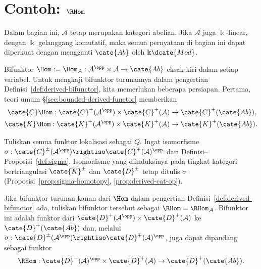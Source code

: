 
\section{Contoh: \texorpdfstring{$\RHom$}{RHom}}\label{sec:RHom}
\hypertarget{o014.aljabr2.chapter4.rhom}{ }

Dalam bagian ini, $\mathcal{A}$ tetap merupakan kategori abelian. Jika
$\mathcal{A}$ juga $\Bbbk$-linear, dengan $\Bbbk$ gelanggang komutatif, maka
semua pernyataan di bagian ini dapat diperkuat dengan mengganti $\cate{Ab}$
oleh $\Bbbk\dcate{Mod}$.

Bifunktor
$\Hom:=\Hom_{\mathcal{A}}:\mathcal{A}^{\opp}\times\mathcal{A}\to\cate{Ab}$
eksak kiri dalam setiap variabel. Untuk mengkaji bifunktor turunannya dalam
pengertian Definisi~\ref{def:derived-bifunctor}, kita memerlukan beberapa
persiapan. Pertama, teori umum \S\ref{sec:bounded-derived-functor} memberikan
\begin{align*}
	\cate{C}\Hom: \cate{C}^+(\mathcal{A}^{\opp}) \times \cate{C}^+(\mathcal{A}) & \to \cate{C}^+(\cate{Ab}), \\
	\cate{K}\Hom: \cate{K}^+(\mathcal{A}^{\opp}) \times \cate{K}^+(\mathcal{A}) & \to \cate{K}^+(\cate{Ab}).
\end{align*}

Tuliskan semua funktor lokalisasi sebagai $Q$. Ingat isomorfisme
$\sigma:\cate{C}^\pm(\mathcal{A}^{\opp})\rightiso
\cate{C}^{\mp}(\mathcal{A})^{\opp}$ dari
Definisi--Proposisi~\ref{def:sigma}. Isomorfisme yang diinduksinya pada tingkat
kategori bertriangulasi $\cate{K}^\pm$ dan $\cate{D}^\pm$ tetap ditulis
$\sigma$ (Proposisi~\ref{prop:sigma-homotopy}, \ref{prop:derived-cat-op}).

\begin{definisi}
	Jika bifunktor turunan kanan dari $\Hom$ dalam pengertian
	Definisi~\ref{def:derived-bifunctor} ada, tuliskan bifunktor tersebut sebagai
	$\RHom=\RHom_{\mathcal{A}}$. Bifunktor ini adalah funktor dari
	$\cate{D}^+(\mathcal{A}^{\opp})\times\cate{D}^+(\mathcal{A})$ ke
	$\cate{D}^+(\cate{Ab})$ dan, melalui
	$\sigma:\cate{D}^{\pm}(\mathcal{A}^{\opp})\rightiso
	\cate{D}^{\mp}(\mathcal{A})^{\opp}$, juga dapat dipandang sebagai funktor
	\[ \RHom: \cate{D}^-(\mathcal{A})^{\opp} \times \cate{D}^+(\mathcal{A}) \to \cate{D}^+(\cate{Ab}). \]
\end{definisi}

